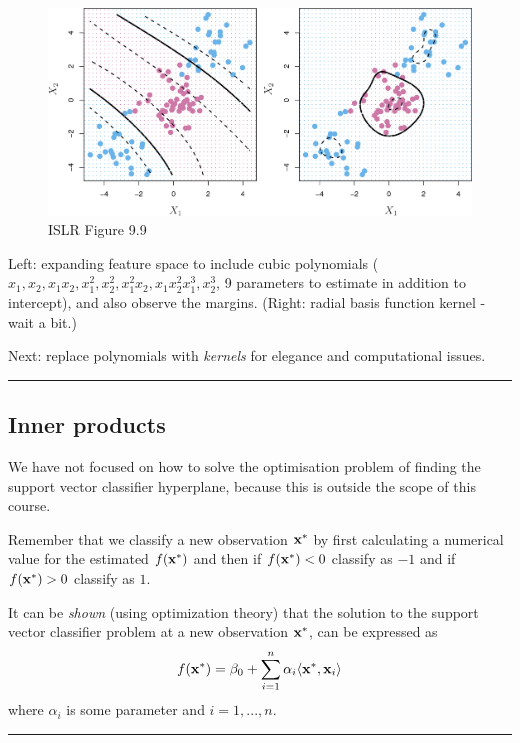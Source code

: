 \documentclass[]{article}
\begin{document}
\begin{figure}
\centering
\includegraphics{../ISLR/Chapter9/9.9.png}
\caption{ISLR Figure 9.9}
\end{figure}

Left: expanding feature space to include cubic polynomials
(\(x_1,x_2,x_1x_2,x_1^2,x_2^2,x_1^2x_2,x_1x_2^2x_1^3,x_2^3\), 9
parameters to estimate in addition to intercept), and also observe the
margins. (Right: radial basis function kernel - wait a bit.)

Next: replace polynomials with \emph{kernels} for elegance and
computational issues.

\begin{center}\rule{0.5\linewidth}{\linethickness}\end{center}

\hypertarget{inner-products}{%
\subsection{Inner products}\label{inner-products}}

We have not focused on how to solve the optimisation problem of finding
the support vector classifier hyperplane, because this is outside the
scope of this course.

Remember that we classify a new observation \({\bf x}^*\) by first
calculating a numerical value for the estimated \(f({\bf x}^*)\) and
then if \(f({\bf x}^*)<0\) classify as \(-1\) and if \(f({\bf x}^*)>0\)
classify as \(1\).

It can be \emph{shown} (using optimization theory) that the solution to
the support vector classifier problem at a new observation
\({\bf x}^*\), can be expressed as \[
f({\bf x}^*)=\beta_0 + \sum_{i=1}^n \alpha_i \langle {\bf x}^*,{\bf x}_i \rangle
\] where \(\alpha_i\) is some parameter and \(i=1,...,n\).

\begin{center}\rule{0.5\linewidth}{\linethickness}\end{center}
\end{document}
